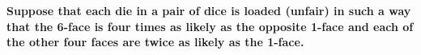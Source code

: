 \textbf{Suppose that each die in a pair of dice is loaded (unfair) in such a way that the
6-face is four times as likely as the opposite 1-face and each of the other four faces are twice as likely as the 1-face.\\\\}